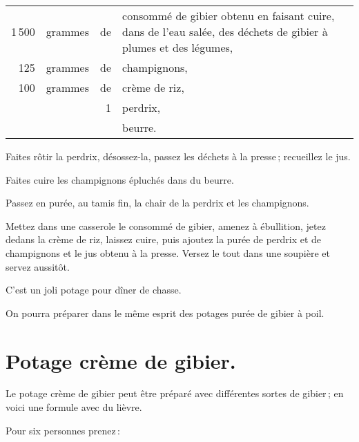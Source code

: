 \footnotesize
\begin{longtable}{rrrp{16em}}                                                    
  1 500 & grammes     & de  & consommé de gibier obtenu en faisant cuire, dans de l'eau 
                              salée, des déchets de gibier à plumes et des légumes,                       \\
    125 & grammes     & de  & champignons,                                                                \\
    100 & grammes     & de  & crème de riz,                                                               \\
        &             &  1  & perdrix,                                                                    \\
        &             &     & beurre.                                                                     \\
\end{longtable}
\normalsize                           

Faites rôtir la perdrix, désossez-la, passez les déchets à la presse ; recueillez le jus.

Faites cuire les champignons épluchés dans du beurre.

Passez en purée, au tamis fin, la chair de la perdrix et les champignons.

Mettez dans une casserole le consommé de gibier, amenez à ébullition, jetez
dedans la crème de riz, laissez cuire, puis ajoutez la purée de perdrix et de
champignons et le jus obtenu à la presse. Versez le tout dans une soupière et
servez aussitôt.

C'est un joli potage pour dîner de chasse.

\sk

On pourra préparer dans le même esprit des potages purée de gibier à poil.

\section*{\centering Potage crème de gibier.}

Le potage crème de gibier peut être préparé avec différentes sortes de gibier ;
en voici une formule avec du lièvre.

\medskip

Pour six personnes prenez :

\medskip

